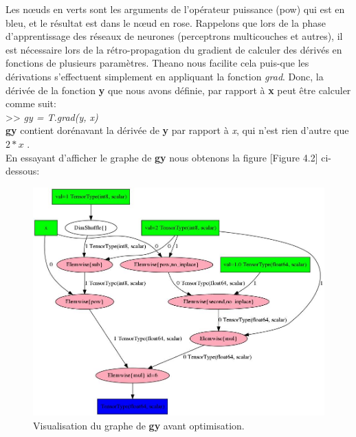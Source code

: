 	Les nœuds en verts sont les arguments de l'opérateur puissance (pow) qui est en bleu, et le résultat est dans le nœud en rose.
	Rappelons que lors de la phase d'apprentissage des réseaux de neurones (perceptrons multicouches et autres), il est nécessaire lors de la rétro-propagation du gradient de calculer des dérivés en fonctions de plusieurs paramètres. Theano nous facilite cela puis-que les dérivations s'effectuent simplement en appliquant la fonction \textit{grad}. 
Donc, la dérivée de la fonction \textbf{y} que nous avons définie, par rapport à \textbf{x} peut être calculer comme suit: \\

>> \textit{gy = T.grad(y, x)}\\

\textbf{gy} contient dorénavant la dérivée de \textbf{y} par rapport à \textit{x}, qui n'est rien d'autre que $2*x$ .\\

 
	En essayant d'afficher le graphe de \textbf{gy} nous obtenons la figure [Figure 4.2] ci-dessous:

\begin{figure}[H]
	\centering
		\includegraphics[width=5in]{Figures/beforeOptimization.png}
	\caption[TheanoGraph]{Visualisation du graphe de \textbf{gy} avant optimisation.}
	\label{fig:Electron}
\end{figure}

